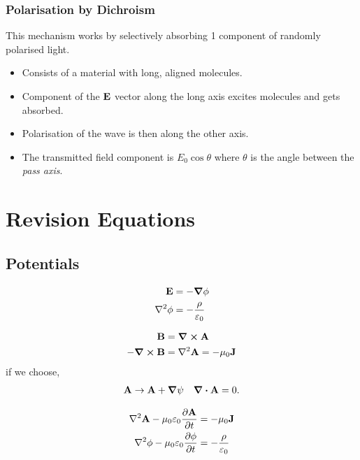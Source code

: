 \documentclass{book}
\begin{document}
{\subsection{Polarisation by Dichroism}
This mechanism works by selectively absorbing 1 component of randomly polarised light.
\begin{itemize}
	\item Consists of a material with long, aligned molecules.
	\item Component of the $\vb{E}$ vector along the long axis excites molecules and gets absorbed.
	\item Polarisation of the wave is then along the other axis.
	\item The transmitted field component is $E_0\cos\theta$ where $\theta$ is the angle between the \textit{pass axis}.
\end{itemize}
\appendix
\chapter{Revision Equations}
\section{Potentials}
\begin{tcolorbox}[colback=red!5!white,colframe=red!75!black,title=Static Electric Potential]
	\begin{align}
		\vb{E} &= - \grad \phi \\
		\laplacian{\phi} &= - \frac{\rho}{\varepsilon_0}
	\end{align}
\end{tcolorbox}
\begin{tcolorbox}[colback=blue!5!white,colframe=blue!75!black,title=Static Magnetic Potential]
	\begin{align}
		\vb{B} &= \curl{\vb{A}} \\
		-\curl{\vb{B}} &= \laplacian{\vb{A}} = - \mu_0 \vb{J}
	\end{align} 
	if we choose,
	\begin{align}
		\vb{A} \to \vb{A} + \grad{\psi} && \div{\vb{A}} = 0.
	\end{align}
\end{tcolorbox}
\begin{tcolorbox}[colback=green!5!white,colframe=green!75!black,title=Dynamic Potentials]
	\begin{align}
		\laplacian\vb{A} - \mu_0\varepsilon_0 \pdv{\vb{A}}{t} &= - \mu_0 \vb{J} \label{eq:A} \\
		\laplacian\vb{\phi} - \mu_0\varepsilon_0\pdv{\phi}{t} &= -\frac{\rho}{\varepsilon_0} \label{eq:phi}
	\end{align}
\end{tcolorbox}
}
\end{document}
